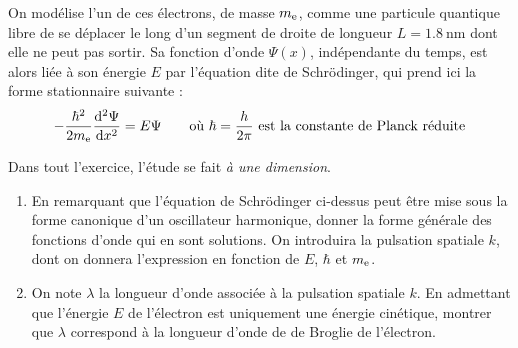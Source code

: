 \documentclass[a4paper,french,bookmarks]{article}
\begin{document}
On modélise l'un de ces électrons, de masse $m_\text e$, comme une particule quantique libre de se déplacer le long d'un segment de droite de longueur $L = \SI{1.8}{\nano\meter}$ dont elle ne peut pas sortir. Sa fonction d'onde $\Psi(x)$, indépendante du temps, est alors liée à son énergie $E$ par l'équation dite de Schrödinger, qui prend ici la forme stationnaire suivante :
%
\begin{equation}
    - \dfrac{\hbar^2}{2m_\text e} \dfrac{\mathrm d^2 \Psi}{\mathrm d x^2} = E\Psi \qquad\text{où} \ \hbar = \dfrac{h}{2\pi} \ \text{est la constante de Planck réduite}
\end{equation}

Dans tout l'exercice, l'étude se fait \textit{à une dimension}.

\begin{enumerate}
    \item En remarquant que l'équation de Schrödinger ci-dessus peut être mise sous la forme canonique d'un oscillateur harmonique, donner la forme générale des fonctions d'onde qui en sont solutions. On introduira la pulsation spatiale $k$, dont on donnera l'expression en fonction de $E$, $\hbar$ et $m_\text e$.
    
    
    \item On note $\lambda$ la longueur d'onde associée à la pulsation spatiale $k$. En admettant que l'énergie $E$ de l'électron est uniquement une énergie cinétique, montrer que $\lambda$ correspond à la longueur d'onde de de Broglie de l'électron.
    
    

\end{enumerate}
\end{document}
